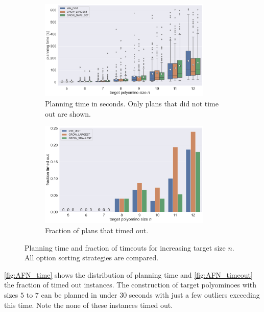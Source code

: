 \begin{figure}
	\centering
	\begin{subfigure}[b]{\textwidth}
		\centering
		\includegraphics[width=0.9\textwidth]{figures/plots/AFN_time.pdf}
		\caption{Planning time in seconds. Only plans that did not time out are shown.}
		\label{fig:AFN_time}
	\end{subfigure}

	\begin{subfigure}[b]{\textwidth}
		\centering
		\includegraphics[width=0.9\textwidth]{figures/plots/AFN_timeout.pdf}
		\caption{Fraction of plans that timed out.}
		\label{fig:AFN_timeout}
	\end{subfigure}
	\caption[Planning time and fraction of timeouts for increasing target size]{Planning time and fraction of timeouts for increasing target size $n$. All option sorting strategies are compared.}
	\label{fig:AFN_timestats}
\end{figure}

\autoref{fig:AFN_time} shows the distribution of planning time and \autoref{fig:AFN_timeout} the fraction of timed out instances.
The construction of target polyominoes with sizes $5$ to $7$ can be planned in under $30$ seconds with just a few outliers exceeding this time.
Note the none of these instances timed out.

